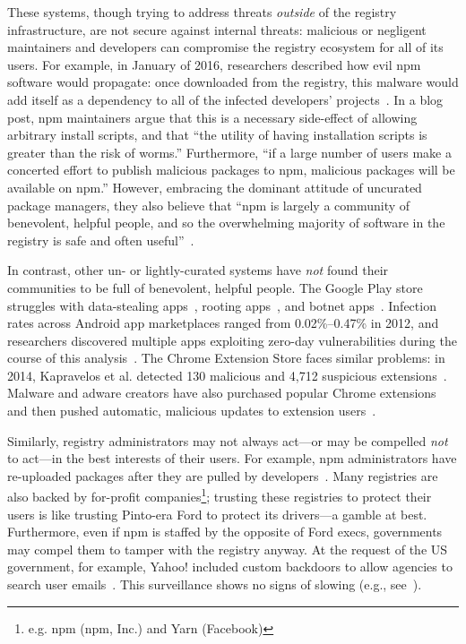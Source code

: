 These systems, though trying to address threats \emph{outside} of the registry
infrastructure, are not secure against internal threats: malicious or negligent
maintainers and developers can compromise the registry ecosystem for all of its
users. For example, in January of 2016, researchers described how evil npm
software would propagate: once downloaded from the registry, this malware would
add itself as a dependency to all of the infected developers'
projects~\cite{npm-package-install}. In a blog post, npm maintainers argue that
this is a necessary side-effect of allowing arbitrary install scripts, and that
``the utility of having installation scripts is greater than the risk of
worms.'' Furthermore, ``if a large number of users make a concerted effort to
publish malicious packages to npm, malicious packages will be available on
npm.'' However, embracing the dominant attitude of uncurated package managers,
they also believe that ``npm is largely a community of benevolent, helpful
people, and so the overwhelming majority of software in the registry is safe
and often useful''~\cite{npm-package-install}.

In contrast, other un- or lightly-curated systems have \emph{not} found their
communities to be full of benevolent, helpful people. The Google Play store
struggles with data-stealing apps~\cite{googleplay-spy}, rooting
apps~\cite{googleplay-root}, and botnet apps~\cite{googleplay-dresscode}.
Infection rates across Android app marketplaces ranged from 0.02\%--0.47\% in
2012, and researchers discovered multiple apps exploiting zero-day
vulnerabilities during the course of this analysis~\cite{zhou2012hey}.  The
Chrome Extension Store faces similar problems: in 2014, Kapravelos et al.
detected 130 malicious and 4,712 suspicious
extensions~\cite{kapravelos2014hulk}.  Malware and adware creators have also
purchased popular Chrome extensions and then pushed automatic, malicious
updates to extension users~\cite{chrome-sale}. 

Similarly, registry administrators may not always act---or may be compelled
\emph{not} to act---in the best interests of their users. For example, npm
administrators have re-uploaded packages after they are pulled by
developers~\cite{leftpad}. Many registries are also backed by for-profit
companies\footnote{e.g. npm (npm, Inc.) and Yarn (Facebook)}; trusting these
registries to protect their users is like trusting Pinto-era Ford to protect
its drivers---a gamble at best. Furthermore, even if npm is staffed by the
opposite of Ford execs, governments may compel them to tamper with the registry
anyway. At the request of the US government, for example, Yahoo! included
custom backdoors to allow agencies to search user emails~\cite{yahoo-backdoor}.
This surveillance shows no signs of slowing (e.g., see~\cite{trumptweet}). 


